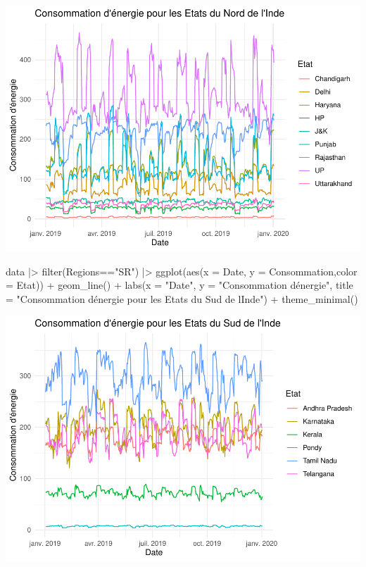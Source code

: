 \documentclass[
]{article}
\newenvironment{Shaded}{\begin{snugshade}}{\end{snugshade}}
\newcommand{\AttributeTok}[1]{\textcolor[rgb]{0.77,0.63,0.00}{#1}}
\newcommand{\FunctionTok}[1]{\textcolor[rgb]{0.00,0.00,0.00}{#1}}
\newcommand{\NormalTok}[1]{#1}
\newcommand{\SpecialCharTok}[1]{\textcolor[rgb]{0.00,0.00,0.00}{#1}}
\newcommand{\StringTok}[1]{\textcolor[rgb]{0.31,0.60,0.02}{#1}}
\begin{document}
\includegraphics{Projet_CHESNAIS_GUIBERT_files/figure-latex/unnamed-chunk-17-3.pdf}

\begin{Shaded}
\begin{Highlighting}[]
\NormalTok{data }\SpecialCharTok{|\textgreater{}} 
  \FunctionTok{filter}\NormalTok{(Regions}\SpecialCharTok{==}\StringTok{"SR"}\NormalTok{) }\SpecialCharTok{|\textgreater{}} 
  \FunctionTok{ggplot}\NormalTok{(}\FunctionTok{aes}\NormalTok{(}\AttributeTok{x =}\NormalTok{ Date, }\AttributeTok{y =}\NormalTok{ Consommation,}\AttributeTok{color =}\NormalTok{ Etat)) }\SpecialCharTok{+}
  \FunctionTok{geom\_line}\NormalTok{() }\SpecialCharTok{+}
  \FunctionTok{labs}\NormalTok{(}\AttributeTok{x =} \StringTok{"Date"}\NormalTok{, }\AttributeTok{y =} \StringTok{"Consommation d\textquotesingle{}énergie"}\NormalTok{, }
       \AttributeTok{title =} \StringTok{"Consommation d\textquotesingle{}énergie pour les Etats du Sud de l\textquotesingle{}Inde"}\NormalTok{) }\SpecialCharTok{+}
  \FunctionTok{theme\_minimal}\NormalTok{()}
\end{Highlighting}
\end{Shaded}

\includegraphics{Projet_CHESNAIS_GUIBERT_files/figure-latex/unnamed-chunk-17-4.pdf}
\end{document}
